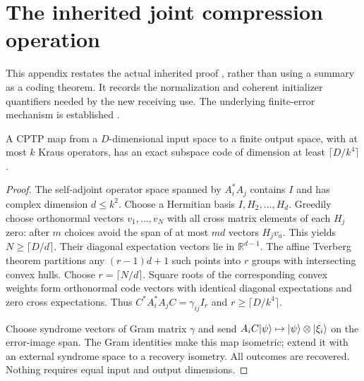 \section{The inherited joint compression operation}\label{app:compression}

This appendix restates the actual inherited proof \cite{Cycle2}, rather than
using a summary as a coding theorem. It records the normalization and coherent
initializer quantifiers needed by the new receiving use. The underlying
finite-error mechanism is established \cite{KLV,GBM,Tverberg}.

\begin{lemma}\label{lem:finitecode}
A CPTP map from a $D$-dimensional input space to a finite output space, with
at most $k$ Kraus operators, has an exact subspace code of dimension at least
$\lceil D/k^4\rceil$.
\end{lemma}
\begin{proof}
The self-adjoint operator space spanned by $A_i^*A_j$ contains $I$ and has
complex dimension $d\le k^2$. Choose a Hermitian basis $I,H_2,\ldots,H_d$.
Greedily choose orthonormal vectors $v_1,\ldots,v_N$ with all cross matrix
elements of each $H_j$ zero: after $m$ choices avoid the span of at most
$md$ vectors $H_jv_a$. This yields $N\ge\lceil D/d\rceil$.
Their diagonal expectation vectors lie in $\mathbb R^{d-1}$. The affine
Tverberg theorem partitions any $(r-1)d+1$ such points into $r$ groups with
intersecting convex hulls. Choose $r=\lceil N/d\rceil$. Square roots of the
corresponding convex weights form orthonormal code vectors with identical
diagonal expectations and zero cross expectations. Thus
$C^*A_i^*A_jC=\gamma_{ij}I_r$ and $r\ge\lceil D/k^4\rceil$.

Choose syndrome vectors of Gram matrix $\gamma$ and send
$A_iC\lvert \psi\rangle\mapsto\lvert \psi\rangle\otimes\lvert \xi_i\rangle$ on the error-image span.
The Gram identities make this map isometric; extend it with an external
syndrome space to a recovery isometry. All outcomes are recovered. Nothing
requires equal input and output dimensions.
\end{proof}

